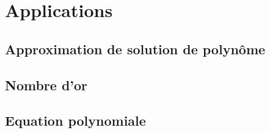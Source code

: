 \section{Applications}
\subsection{Approximation de solution de polynôme}
\setcounter{thequestion}{0}

\subsection{Nombre d'or}
\setcounter{thequestion}{0}

\subsection{Equation polynomiale}
\setcounter{thequestion}{0}

